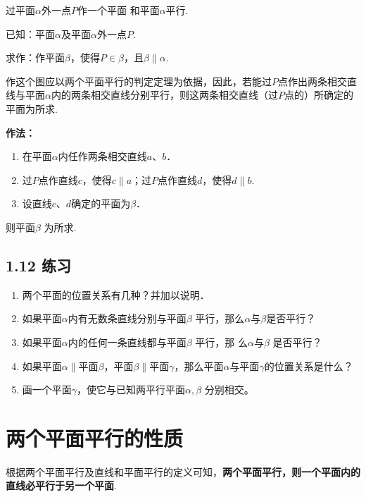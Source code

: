 \begin{example}
过平面$\alpha$外一点$P$作一个平面
和平面$\alpha$平行.

已知：平面$\alpha$及平面$\alpha$外一点$P$.

求作：作平面$\beta$，使得$P\in \beta$，且$\beta \parallel \alpha$.
\end{example}

\begin{analyze}
    作这个图应以两个平面平行的判定定理为依据，因此，若能过$P$点作出两条相交直线与平面$\alpha$内的两条相交直线分别平行，则这两条相交直线（过$P$点的）所确定的平面为所求.
\end{analyze}

\begin{solution}
\textbf{作法：}
\begin{enumerate}[(1)]
\item 在平面$\alpha$内任作两条相交直线$a$、$b$．
\item 过$P$点作直线$c$，使得$c\parallel a$；过$P$点作直线$d$，使得$d\parallel b$.
\item 设直线$c$、$d$确定的平面为$\beta$．
\end{enumerate}
则平面$\beta$ 为所求.
\end{solution}

\subsection*{1.12 练习}
\begin{enumerate}
\item 两个平面的位置关系有几种？并加以说明．
\item 如果平面$\alpha$内有无数条直线分别与平面$\beta$ 平行，那么$\alpha$与$\beta$是否平行？
\item 如果平面$\alpha$内的任何一条直线都与平面$\beta$ 平行，那
么$\alpha$与$\beta$ 是否平行？
\item 如果平面$\alpha\parallel $平面$\beta$，平面$\beta \parallel$平面$\gamma$，那么平面$\alpha$与平面$\gamma$的位置关系是什么？
\item 画一个平面$\gamma$，使它与已知两平行平面$\alpha,\beta$ 分别相交。
\end{enumerate}

\section{两个平面平行的性质}
根据两个平面平行及直线和平面平行的定义可知，\textbf{两个平面平行，则一个平面内的直线必平行于另一个平面}.

